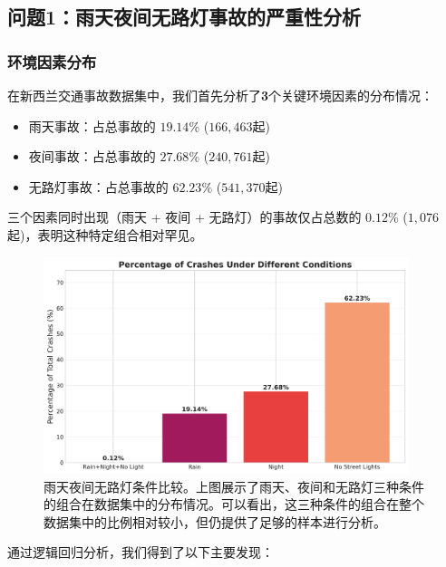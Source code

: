 \documentclass[12pt,a4paper]{article}
\begin{document}
\subsection{问题1：雨天夜间无路灯事故的严重性分析}

\subsubsection{环境因素分布}

在新西兰交通事故数据集中，我们首先分析了\textbf{3}个关键环境因素的分布情况：

\begin{itemize}
\item 雨天事故：占总事故的 $19.14\%$ ($166,463$起)
\item 夜间事故：占总事故的 $27.68\%$ ($240,761$起)
\item 无路灯事故：占总事故的 $62.23\%$ ($541,370$起)
\end{itemize}

三个因素同时出现（雨天 + 夜间 + 无路灯）的事故仅占总数的 $0.12\%$ ($1,076$起)，表明这种特定组合相对罕见。

\begin{figure}[!htbp]
  \centering
  \includegraphics[width=0.95\textwidth]{rain_night_no_light_comparison.png}
  \caption{雨天夜间无路灯条件比较。上图展示了雨天、夜间和无路灯三种条件的组合在数据集中的分布情况。可以看出，这三种条件的组合在整个数据集中的比例相对较小，但仍提供了足够的样本进行分析。}
  \label{fig:condition_comparison}
\end{figure}

通过逻辑回归分析，我们得到了以下主要发现：
\end{document}
